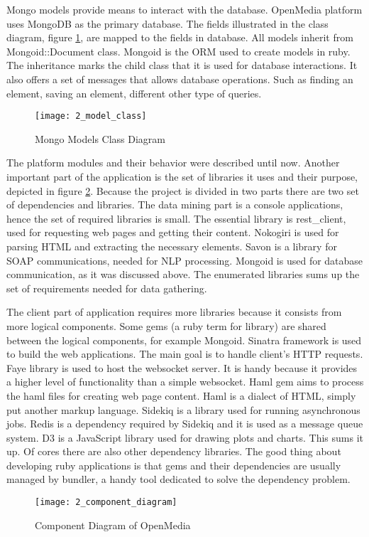 Mongo models provide means to interact with the database. OpenMedia platform uses MongoDB as the primary database. The fields illustrated in the class diagram, figure \ref{model_class}, are mapped to the fields in database. All models inherit from Mongoid::Document class. Mongoid is the ORM used to create models in ruby. The inheritance marks the child class that it is used for database interactions. It also offers a set of messages that allows database operations. Such as finding an element, saving an element, different other type of queries.

\begin{figure}[!ht]
\centering
\vspace*{0.2cm}
\texttt{[image: 2\_model\_class]}
\caption{Mongo Models Class Diagram}\label{model_class}
\end{figure}

The platform modules and their behavior were described until now. Another important part of the application is the set of libraries it uses and their purpose, depicted in figure \ref{component_diagram}. Because the project is divided in two parts there are two set of dependencies and libraries. The data mining part is a console applications, hence the set of required libraries is small. The essential library is rest\_client, used for requesting web pages and getting their content. Nokogiri is used for parsing HTML and extracting the necessary elements. Savon is a library for SOAP communications, needed for NLP processing. Mongoid is used for database communication, as it was discussed above. The enumerated libraries sums up the set of requirements needed for data gathering.

The client part of application requires more libraries because it consists from more logical components. Some gems (a ruby term for library) are shared between the logical components, for example Mongoid. Sinatra framework is used to build the web applications. The main goal is to handle client's HTTP requests. Faye library is used to host the websocket server. It is handy because it provides a higher level of functionality than a simple websocket. Haml gem aims to process the haml files for creating web page content. Haml is a dialect of HTML, simply put another markup language. Sidekiq is a library used for running asynchronous jobs. Redis is a dependency required by Sidekiq and it is used as a message queue system. D3 is a JavaScript library used for drawing plots and charts. This sums it up. Of cores there are also other dependency libraries. The good thing about developing ruby applications is that gems and their dependencies are usually managed by bundler, a handy tool dedicated to solve the dependency problem.
\begin{figure}[!ht]
\centering
\texttt{[image: 2\_component\_diagram]}
\caption{Component Diagram of OpenMedia}\label{component_diagram}
\end{figure}

